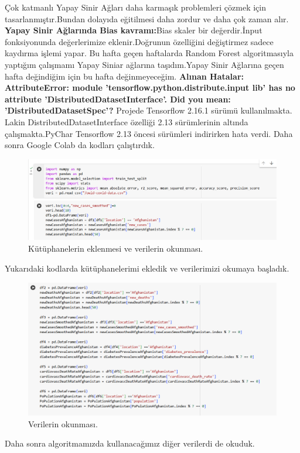 \documentclass[12pt, a4paper]{article}
\begin{document}
	\newpage Çok katmanlı Yapay Sinir Ağları daha karmaşık problemleri çözmek için tasarlanmıştır.Bundan dolayıda eğitilmesi daha zordur ve daha çok zaman alır.
	\newline \textbf{Yapay Sinir Ağlarında Bias kavramı:}Bias skaler bir değerdir.İnput fonksiyonunda değerlerimize eklenir.Doğrunun özelliğini değiştirmez sadece kaydırma işlemi yapar.
	Bu hafta geçen haftalarda Random Forest algoritmasıyla yaptığım çalışmamı Yapay Siniar ağlarına taşıdım.Yapay Sinir Ağlarına geçen hafta değindiğim için bu hafta değinmeyeceğim.
	\newline \textbf{Alınan Hatalar:} \textbf{AttributeError: module 'tensorflow.python.distribute.input lib' has no attribute 'DistributedDatasetInterface'. Did you mean: 'DistributedDatasetSpec'?
	} Projede Tensorflow 2.16.1 sürümü kullanılmakta. Lakin DistributedDatasetInterface özelliği 2.13 sürümlerinin altında çalışmakta.PyChar Tensorflow 2.13 öncesi sürümleri indirirken hata verdi. Daha sonra Google Colab da kodları çalıştırdık.
	\begin{figure}[!h]
		\centering
		\includegraphics{5.2.png}
		\caption{Kütüphanelerin eklenmesi ve verilerin okunması.}
	\end{figure}
	\newline Yukarıdaki kodlarda kütüphanelerimi ekledik ve verilerimizi okumaya başladık.
	\begin{figure}[!h]
		\centering
		\includegraphics{5.3.png}
		\caption{Verilerin okunması.}
	\end{figure}
	\newpage Daha sonra algoritmamızda kullanacağımız diğer verilerdi de okuduk.
	
\end{document}
